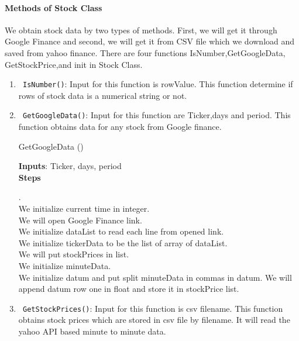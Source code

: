 \paragraph{Methods of Stock Class}
We obtain stock data by two types of methods. First, we will get it through Google Finance and second, we will get it from CSV file which we download and saved from yahoo finance.
There are four functions IsNumber,GetGoogleData, GetStockPrice,and init in Stock Class.
\begin{enumerate}
  \item \verb! IsNumber()!: Input for this function is rowValue. This function determine if rows of stock data is a numerical string or not.
  \item \verb! GetGoogleData()!: Input for this function are Ticker,days and period. This function obtains data for any stock from Google
  finance.
  \begin{algorithm}
  \caption{GetGoogleData ()}
  \bigskip
  \textbf{Inputs}: Ticker, days, period\\
  \textbf{Steps}
  \begin{algorithmic}[1]
  .
  \Else 
  \EndIf\\
  We initialize current time in integer.\\
  We will open Google Finance link.\\
  We initialize dataList to read each line from opened link.\\
  We initialize tickerData to be the list of array of dataList.\\
  We will put stockPrices in list.\\
  We initialize  minuteData.\\
  \State We initialize datum and put split minuteData in commas in datum.
  \State We will append datum row one in float and store it in stockPrice list.\\
  \end{algorithmic}
  \end{algorithm}
  \item \verb! GetStockPrices()!: Input for this function is csv filename. This function obtains stock prices which are stored
  in csv file by filename. It will read the yahoo API based minute to minute data.
  \begin{algorithm}

\end{algorithm}
\end{enumerate}
